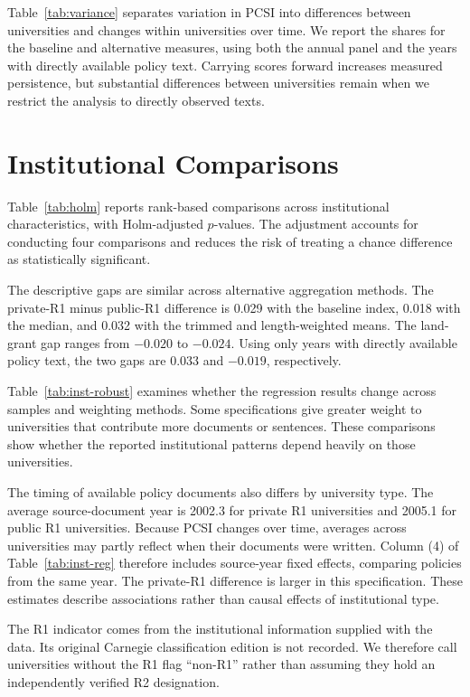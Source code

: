 \documentclass[11pt]{article}
\begin{document}
Table~\ref{tab:variance} separates variation in PCSI into differences between universities and changes within universities over time. We report the shares for the baseline and alternative measures, using both the annual panel and the years with directly available policy text. Carrying scores forward increases measured persistence, but substantial differences between universities remain when we restrict the analysis to directly observed texts.



\section{Institutional Comparisons}\label{app:inst}
\setcounter{table}{0}

Table~\ref{tab:holm} reports rank-based comparisons across institutional characteristics, with Holm-adjusted $p$-values. The adjustment accounts for conducting four comparisons and reduces the risk of treating a chance difference as statistically significant.

The descriptive gaps are similar across alternative aggregation methods. The private-R1 minus public-R1 difference is 0.029 with the baseline index, 0.018 with the median, and 0.032 with the trimmed and length-weighted means. The land-grant gap ranges from $-0.020$ to $-0.024$. Using only years with directly available policy text, the two gaps are 0.033 and $-0.019$, respectively.



Table~\ref{tab:inst-robust} examines whether the regression results change across samples and weighting methods. Some specifications give greater weight to universities that contribute more documents or sentences. These comparisons show whether the reported institutional patterns depend heavily on those universities.

The timing of available policy documents also differs by university type. The average source-document year is 2002.3 for private R1 universities and 2005.1 for public R1 universities. Because PCSI changes over time, averages across universities may partly reflect when their documents were written. Column (4) of Table~\ref{tab:inst-reg} therefore includes source-year fixed effects, comparing policies from the same year. The private-R1 difference is larger in this specification. These estimates describe associations rather than causal effects of institutional type.

The R1 indicator comes from the institutional information supplied with the data. Its original Carnegie classification edition is not recorded. We therefore call universities without the R1 flag ``non-R1'' rather than assuming they hold an independently verified R2 designation.
\end{document}

